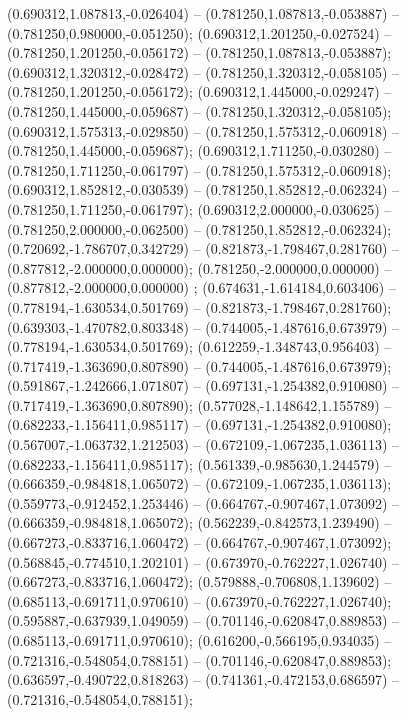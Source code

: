  (0.690312,1.087813,-0.026404) -- (0.781250,1.087813,-0.053887) -- (0.781250,0.980000,-0.051250);
 (0.690312,1.201250,-0.027524) -- (0.781250,1.201250,-0.056172) -- (0.781250,1.087813,-0.053887);
 (0.690312,1.320312,-0.028472) -- (0.781250,1.320312,-0.058105) -- (0.781250,1.201250,-0.056172);
 (0.690312,1.445000,-0.029247) -- (0.781250,1.445000,-0.059687) -- (0.781250,1.320312,-0.058105);
 (0.690312,1.575313,-0.029850) -- (0.781250,1.575312,-0.060918) -- (0.781250,1.445000,-0.059687);
 (0.690312,1.711250,-0.030280) -- (0.781250,1.711250,-0.061797) -- (0.781250,1.575312,-0.060918);
 (0.690312,1.852812,-0.030539) -- (0.781250,1.852812,-0.062324) -- (0.781250,1.711250,-0.061797);
 (0.690312,2.000000,-0.030625) -- (0.781250,2.000000,-0.062500) -- (0.781250,1.852812,-0.062324);
 (0.720692,-1.786707,0.342729) -- (0.821873,-1.798467,0.281760) -- (0.877812,-2.000000,0.000000);
 (0.781250,-2.000000,0.000000) -- (0.877812,-2.000000,0.000000) ;
 (0.674631,-1.614184,0.603406) -- (0.778194,-1.630534,0.501769) -- (0.821873,-1.798467,0.281760);
 (0.639303,-1.470782,0.803348) -- (0.744005,-1.487616,0.673979) -- (0.778194,-1.630534,0.501769);
 (0.612259,-1.348743,0.956403) -- (0.717419,-1.363690,0.807890) -- (0.744005,-1.487616,0.673979);
 (0.591867,-1.242666,1.071807) -- (0.697131,-1.254382,0.910080) -- (0.717419,-1.363690,0.807890);
 (0.577028,-1.148642,1.155789) -- (0.682233,-1.156411,0.985117) -- (0.697131,-1.254382,0.910080);
 (0.567007,-1.063732,1.212503) -- (0.672109,-1.067235,1.036113) -- (0.682233,-1.156411,0.985117);
 (0.561339,-0.985630,1.244579) -- (0.666359,-0.984818,1.065072) -- (0.672109,-1.067235,1.036113);
 (0.559773,-0.912452,1.253446) -- (0.664767,-0.907467,1.073092) -- (0.666359,-0.984818,1.065072);
 (0.562239,-0.842573,1.239490) -- (0.667273,-0.833716,1.060472) -- (0.664767,-0.907467,1.073092);
 (0.568845,-0.774510,1.202101) -- (0.673970,-0.762227,1.026740) -- (0.667273,-0.833716,1.060472);
 (0.579888,-0.706808,1.139602) -- (0.685113,-0.691711,0.970610) -- (0.673970,-0.762227,1.026740);
 (0.595887,-0.637939,1.049059) -- (0.701146,-0.620847,0.889853) -- (0.685113,-0.691711,0.970610);
 (0.616200,-0.566195,0.934035) -- (0.721316,-0.548054,0.788151) -- (0.701146,-0.620847,0.889853);
 (0.636597,-0.490722,0.818263) -- (0.741361,-0.472153,0.686597) -- (0.721316,-0.548054,0.788151);
